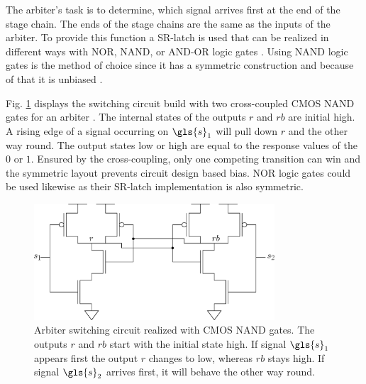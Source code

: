 The arbiter's task is to determine, which signal arrives first at the end of the stage chain.
The ends of the stage chains are the same as the inputs of the arbiter. %
To provide this function a \ac{SR-latch} is used that can be realized in different ways with NOR, NAND, or AND-OR logic gates \cite{Wikipedia2016Flip-flopelectronics}.
Using NAND logic gates is the method of choice since it has a symmetric construction and because of that it is unbiased \cite{Lin2010Low-powerFunctions,Maes2013PhysicallyApplications}.

Fig. \ref{fig:nandarbiter} displays the switching circuit build with two cross-coupled \ac{CMOS} NAND gates for an arbiter \cite{Wikipedia2016NANDGate}.
The internal states of the outputs $r$ and $rb$ are initial high. 
A rising edge of a signal occurring on $\gls{s}_1$ will pull down $r$ and the other way round.
The output states low or high are equal to the response values of the \puf $0$ or $1$. %
Ensured by the cross-coupling, only one competing transition can win and the symmetric layout prevents circuit design based bias.
NOR logic gates could be used likewise as their \ac{SR-latch} implementation is also symmetric.

\begin{figure}[ht]
\centering
\includegraphics[width=0.80\textwidth]{images/arbiter_circuit.eps}
\caption[Arbiter circuit]{Arbiter switching circuit realized with \ac{CMOS} NAND gates. The outputs $r$ and $rb$ start with the initial state high. If signal $\gls{s}_1$ appears first the output $r$ changes to low, whereas $rb$ stays high. If signal $\gls{s}_2$ arrives first, it will behave the other way round.}
\label{fig:nandarbiter}
\end{figure}


